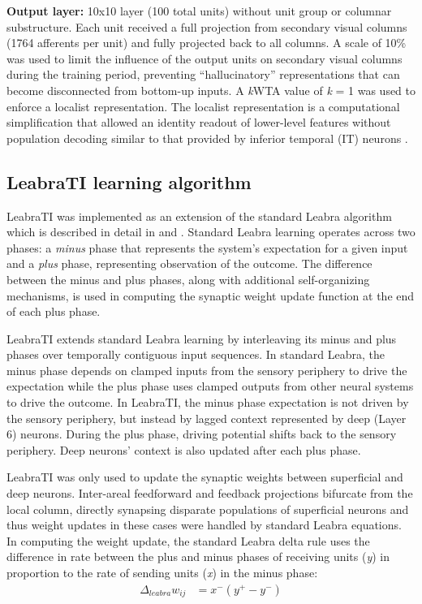 \documentclass[dwyatte_dissertation.tex]{subfiles}
\begin{document}
\textbf{Output layer:} 10x10 layer (100 total units) without unit group or columnar substructure. Each unit received a full projection from secondary visual columns (1764 afferents per unit) and fully projected back to all columns. A scale of 10\% was used to limit the influence of the output units on secondary visual columns during the training period, preventing ``hallucinatory'' representations that can become disconnected from bottom-up inputs. A \textit{k}WTA value of \textit{k} = 1 was used to enforce a localist representation. The localist representation is a computational simplification that allowed an identity readout of lower-level features without population decoding similar to that provided by inferior temporal (IT) neurons  \cite{HungKreimanPoggioEtAl05,LiCoxZoccolanEtAl09}. 

\subsection{LeabraTI learning algorithm}

LeabraTI was implemented as an extension of the standard Leabra algorithm which is described in detail in  and . Standard Leabra learning operates across two phases: a \textit{minus} phase that represents the system's expectation for a given input and a \textit{plus} phase, representing observation of the outcome. The difference between the minus and plus phases, along with additional self-organizing mechanisms, is used in computing the synaptic weight update function at the end of each plus phase. 

LeabraTI extends standard Leabra learning by interleaving its minus and plus phases over temporally contiguous input sequences. In standard Leabra, the minus phase depends on clamped inputs from the sensory periphery to drive the expectation while the plus phase uses clamped outputs from other neural systems to drive the outcome. In LeabraTI, the minus phase expectation is not driven by the sensory periphery, but instead by lagged context represented by deep (Layer 6) neurons. During the plus phase, driving potential shifts back to the sensory periphery. Deep neurons' context is also updated after each plus phase.

LeabraTI was only used to update the synaptic weights between superficial and deep neurons. Inter-areal feedforward and feedback projections bifurcate from the local column, directly synapsing disparate populations of superficial neurons and thus weight updates in these cases were handled by standard Leabra equations. In computing the weight update, the standard Leabra delta rule \cite{OReilly96} uses the difference in rate between the plus and minus phases of receiving units (\textit{y}) in proportion to the rate of sending units (\textit{x}) in the minus phase:
\begin{align*}
\Delta_{leabra} w_{ij} &= x^-(y^+ - y^-)
\end{align*}
\end{document}
